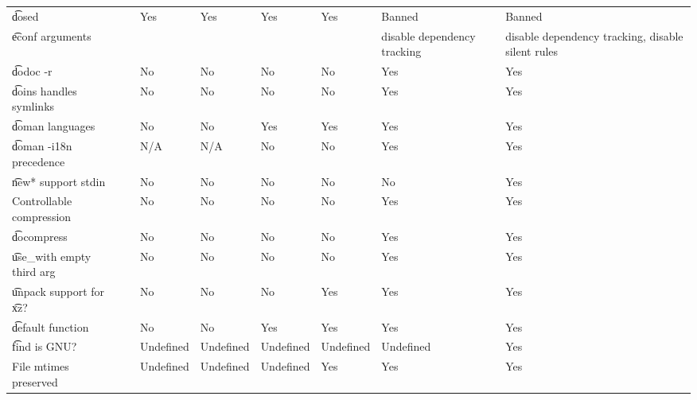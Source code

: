 \begin{landscape}
\begin{longtable}{llP{5em}P{5em}P{6em}P{6em}P{6em}P{6em}}
\t{dosed} &  &
    Yes & Yes & Yes & Yes & Banned & Banned \\

\t{econf} arguments &  &
    &  &  &  & disable dependency tracking & disable dependency tracking, disable silent rules \\

\t{dodoc -r} &  &
    No & No & No & No & Yes & Yes \\

\t{doins} handles symlinks &  &
    No & No & No & No & Yes & Yes \\

\t{doman} languages &  &
    No & No & Yes & Yes & Yes & Yes \\

\t{doman -i18n} precedence &  &
    N/A & N/A & No & No & Yes & Yes \\

\t{new*} support stdin &  &
    No & No & No & No & No & Yes \\

Controllable compression &  &
    No & No & No & No & Yes & Yes \\

\t{docompress} &  &
    No & No & No & No & Yes & Yes \\

\t{use\_with} empty third arg &  &
    No & No & No & No & Yes & Yes \\

\t{unpack} support for \t{xz}? &  &
    No & No & No & Yes & Yes & Yes \\

\t{default} function &  &
    No & No & Yes & Yes & Yes & Yes \\

\t{find} is GNU? &  &
    Undefined & Undefined & Undefined & Undefined & Undefined & Yes \\

File mtimes preserved &  &
    Undefined & Undefined & Undefined & Yes & Yes & Yes \\

\end{longtable}
\end{landscape}

